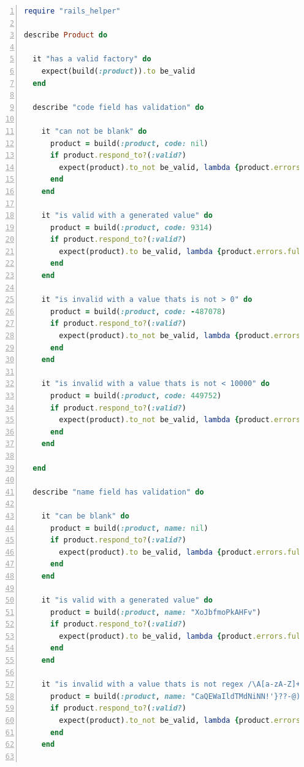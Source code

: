 \documentclass[a4paper,12pt]{article}
\begin{document}
\begin{lstlisting}[frame=single,numbers=left,language = ruby,caption= {Test suite output for Product defined in chapter 6}, label={code:nice}]
require "rails_helper"

describe Product do

  it "has a valid factory" do
    expect(build(:product)).to be_valid
  end

  describe "code field has validation" do

    it "can not be blank" do 
      product = build(:product, code: nil)
      if product.respond_to?(:valid?)
        expect(product).to_not be_valid, lambda {product.errors.full_messages.join("\n")}
      end
    end

    it "is valid with a generated value" do
      product = build(:product, code: 9314)
      if product.respond_to?(:valid?)
        expect(product).to be_valid, lambda {product.errors.full_messages.join("\n")}
      end
    end

    it "is invalid with a value thats is not > 0" do
      product = build(:product, code: -487078)
      if product.respond_to?(:valid?)
        expect(product).to_not be_valid, lambda {product.errors.full_messages.join("\n")}
      end
    end

    it "is invalid with a value thats is not < 10000" do
      product = build(:product, code: 449752)
      if product.respond_to?(:valid?)
        expect(product).to_not be_valid, lambda {product.errors.full_messages.join("\n")}
      end
    end

  end

  describe "name field has validation" do

    it "can be blank" do 
      product = build(:product, name: nil)
      if product.respond_to?(:valid?)
        expect(product).to be_valid, lambda {product.errors.full_messages.join("\n")}
      end
    end

    it "is valid with a generated value" do
      product = build(:product, name: "XoJbfmoPkAHFv")
      if product.respond_to?(:valid?)
        expect(product).to be_valid, lambda {product.errors.full_messages.join("\n")}
      end
    end

    it "is invalid with a value thats is not regex /\A[a-zA-Z]+\z/" do
      product = build(:product, name: "CaQEWaIldTMdNiNN!'}??-@)&\"(-'*:]!'(FnahDn8DrLNY6_5u04e0jrEPQJmWX")
      if product.respond_to?(:valid?)
        expect(product).to_not be_valid, lambda {product.errors.full_messages.join("\n")}
      end
    end


\end{lstlisting}
\end{document}
